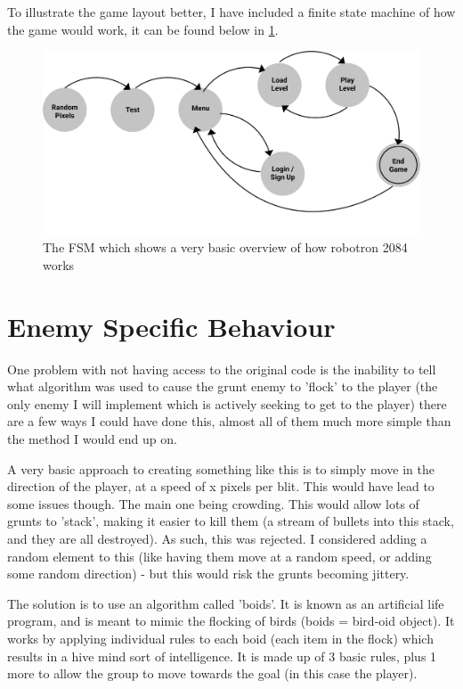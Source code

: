 To illustrate the game layout better, I have included a finite state machine of how the game would work, it can be found below in \ref{fig:Robotron_FSM}.

\begin{figure}[ht!]
  \includegraphics[width=0.8\linewidth]{Figures/FSM_robotrom.png}
  \centering
  \caption{The FSM which shows a very basic overview of how robotron 2084 works}
  \label{fig:Robotron_FSM}
\end{figure}


\section{Enemy Specific Behaviour}
One problem with not having access to the original code is the inability to tell what algorithm was used to cause the grunt enemy to 'flock' to the player (the only enemy I will implement which is actively seeking to get to the player) there are a few ways I could have done this, almost all of them much more simple than the method I would end up on.

A very basic approach to creating something like this is to simply move in the direction of the player, at a speed of x pixels per blit. This would have lead to some issues though. The main one being crowding. This would allow lots of grunts to 'stack', making it easier to kill them (a stream of bullets into this stack, and they are all destroyed). As such, this was rejected. I considered adding a random element to this (like having them move at a random speed, or adding some random direction) - but this would risk the grunts becoming jittery.

The solution is to use an algorithm called 'boids'. It is known as an artificial life program, and is meant to mimic the flocking of birds (boids = bird-oid object). It works by applying individual rules to each boid (each item in the flock) which results in a hive mind sort of intelligence. It is made up of 3 basic rules, plus 1 more to allow the group to move towards the goal (in this case the player).

